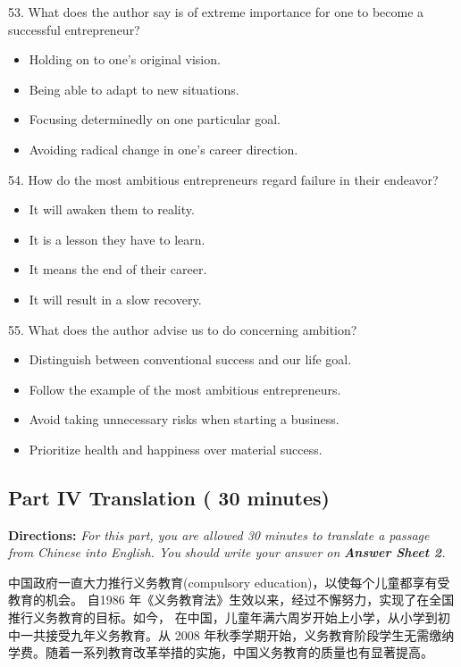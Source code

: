 \documentclass[UTF8,11pt]{ctexart}
\begin{document}
53. What does the author say is of extreme importance for one to become a successful entrepreneur?


\begin{itemize}[leftmargin=2em,itemsep=.2em,topsep=.4em]\item[A.] Holding on to one’s original vision.
\item[B.] Being able to adapt to new situations.
\item[C.] Focusing determinedly on one particular goal.
\item[D.] Avoiding radical change in one’s career direction.
\end{itemize}

54. How do the most ambitious entrepreneurs regard failure in their endeavor?


\begin{itemize}[leftmargin=2em,itemsep=.2em,topsep=.4em]\item[A.] It will awaken them to reality.
\item[B.] It is a lesson they have to learn.
\item[C.] It means the end of their career.
\item[D.] It will result in a slow recovery.
\end{itemize}

55. What does the author advise us to do concerning ambition?


\begin{itemize}[leftmargin=2em,itemsep=.2em,topsep=.4em]\item[A.] Distinguish between conventional success and our life goal.
\item[B.] Follow the example of the most ambitious entrepreneurs.
\item[C.] Avoid taking unnecessary risks when starting a business.
\item[D.] Prioritize health and happiness over material success.
\end{itemize}

\subsection*{\textbf{Part IV Translation} \textbf{( 30 minutes)}}


\textbf{Directions: }\textit{For this part, you are allowed 30 minutes to translate a passage from Chinese into English. You} \textit{should write your answer on }\textbf{\textit{Answer Sheet 2}}\textit{.}


中国政府一直大力推行义务教育(compulsory education)，以使每个儿童都享有受教育的机会。 自1986 年《义务教育法》生效以来，经过不懈努力，实现了在全国推行义务教育的目标。如今， 在中国，儿童年满六周岁开始上小学，从小学到初中一共接受九年义务教育。从 2008 年秋季学期开始，义务教育阶段学生无需缴纳学费。随着一系列教育改革举措的实施，中国义务教育的质量也有显著提高。
\end{document}
